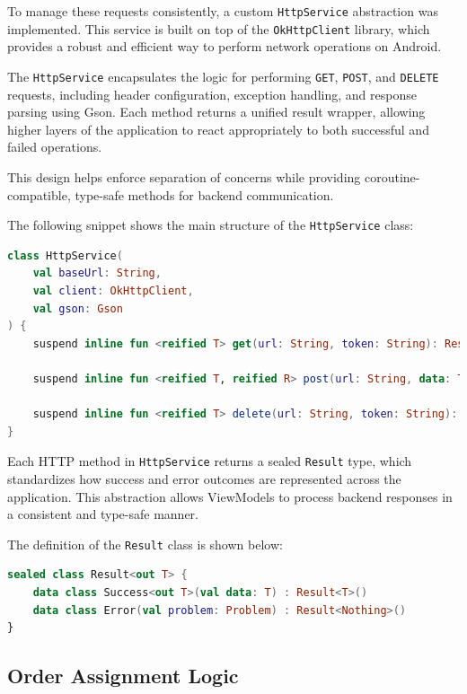 To manage these requests consistently, a custom \texttt{HttpService} abstraction was implemented. This service is built on top of the \texttt{OkHttpClient} library, which provides a robust and efficient way to perform network operations on Android.

The \texttt{HttpService} encapsulates the logic for performing \texttt{GET}, \texttt{POST}, and \texttt{DELETE} requests, including header configuration, exception handling, and response parsing using Gson. Each method returns a unified result wrapper, allowing higher layers of the application to react appropriately to both successful and failed operations.

This design helps enforce separation of concerns while providing coroutine-compatible, type-safe methods for backend communication.

The following snippet shows the main structure of the \texttt{HttpService} class:

\begin{lstlisting}[language=Kotlin, caption={Frontend HttpService class for coroutine-based requests}]
class HttpService(
    val baseUrl: String,
    val client: OkHttpClient,
    val gson: Gson
) {
    suspend inline fun <reified T> get(url: String, token: String): Result<T> { ... }

    suspend inline fun <reified T, reified R> post(url: String, data: T, token: String): Result<R> { ... }

    suspend inline fun <reified T> delete(url: String, token: String): Result<T> { ... }
}
\end{lstlisting}

Each HTTP method in \texttt{HttpService} returns a sealed \texttt{Result} type, which standardizes how success and error outcomes are represented across the application. This abstraction allows ViewModels to process backend responses in a consistent and type-safe manner.

The definition of the \texttt{Result} class is shown below:

\begin{lstlisting}[language=Kotlin, caption={Sealed Result class used for HTTP responses}]
sealed class Result<out T> {
    data class Success<out T>(val data: T) : Result<T>()
    data class Error(val problem: Problem) : Result<Nothing>()
}
\end{lstlisting}

\subsection{Order Assignment Logic}

